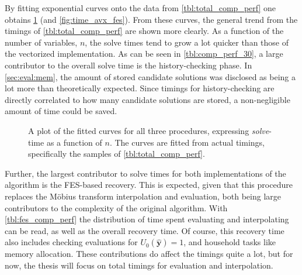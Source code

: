 By fitting exponential curves onto the data from \cref{tbl:total_comp_perf} one obtains \cref{fig:time_dinur_fes} (and \cref{fig:time_avx_fes}). From these curves, the general trend from the timings of \cref{tbl:total_comp_perf} are shown more clearly. As a function of the number of variables, $n$, the solve times tend to grow a lot quicker than those of the vectorized implementation. As can be seen in \cref{tbl:comp_perf_30}, a large contributor to the overall solve time is the history-checking phase. In \cref{sec:eval:mem}, the amount of stored candidate solutions was disclosed as being a lot more than theoretically expected. Since timings for history-checking are directly correlated to how many candidate solutions are stored, a non-negligible amount of time could be saved.

\begin{figure}[t]
    \centering
    \caption{A plot of the fitted curves for all three procedures, expressing \textit{solve}-time as a function of $n$. The curves are fitted from actual timings, specifically the samples of \cref{tbl:total_comp_perf}.} \label{fig:time_dinur_fes}
\end{figure}

Further, the largest contributor to solve times for both implementations of the algorithm is the FES-based recovery. This is expected, given that this procedure replaces the Möbius transform interpolation and evaluation, both being large contributors to the complexity of the original algorithm. With \cref{tbl:fes_comp_perf} the distribution of time spent evaluating and interpolating can be read, as well as the overall recovery time. Of course, this recovery time also includes checking evaluations for $U_0(\hat{\mathbf{y}}) = 1$, and household tasks like memory allocation. These contributions do affect the timings quite a lot, but for now, the thesis will focus on total timings for evaluation and interpolation.

